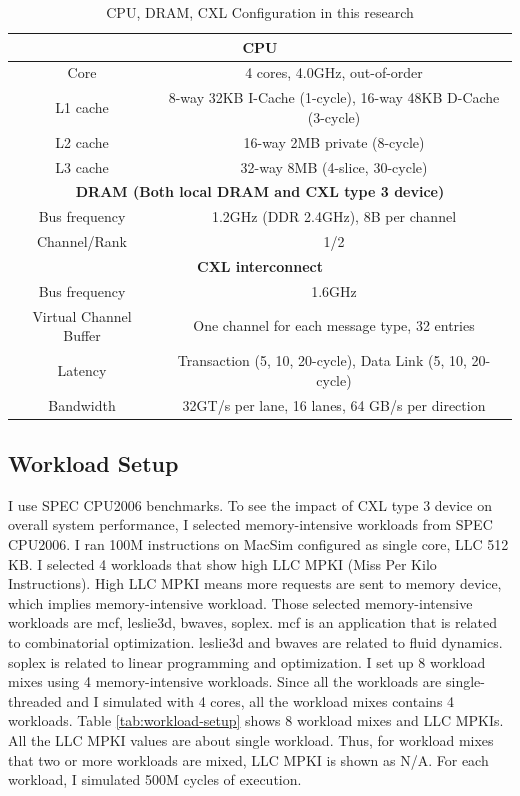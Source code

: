 \begin{table}[t]
  \centering
  \caption{CPU, DRAM, CXL Configuration in this research}
  \label{tab:configuration}
 \begin{tabular}{|c || c|} 
 \hline
 \multicolumn{2}{|c|}{\textbf{CPU}} \\
 \hline
 Core & 4 cores, 4.0GHz, out-of-order \\ 
 L1 cache & 8-way 32KB I-Cache (1-cycle), 16-way 48KB D-Cache (3-cycle) \\
 L2 cache & 16-way 2MB private (8-cycle) \\
 L3 cache & 32-way 8MB (4-slice, 30-cycle) \\
 \hline \hline
 \multicolumn{2}{|c|}{\textbf{DRAM (Both local DRAM and CXL type 3 device)}} \\
 \hline
 Bus frequency & 1.2GHz (DDR 2.4GHz), 8B per channel \\
 Channel/Rank & 1/2 \\
 \hline \hline
 \multicolumn{2}{|c|}{\textbf{CXL interconnect}} \\
 \hline
 Bus frequency & 1.6GHz \\
 Virtual Channel Buffer & One channel for each message type, 32 entries \\
 Latency & Transaction (5, 10, 20-cycle), Data Link (5, 10, 20-cycle) \\
 Bandwidth & 32GT/s per lane, 16 lanes, 64 GB/s per direction \\
 \hline
 \end{tabular}
\end{table}



\subsection{Workload Setup}
\label{sec:workload-setup}
I use SPEC CPU2006 benchmarks. To see the impact of CXL type 3 device on overall system performance, I selected memory-intensive workloads from SPEC CPU2006. I ran 100M instructions on MacSim configured as single core, LLC 512 KB. I selected 4 workloads that show high LLC MPKI (Miss Per Kilo Instructions). High LLC MPKI means more requests are sent to memory device, which implies memory-intensive workload. Those selected memory-intensive workloads are mcf, leslie3d, bwaves, soplex. mcf is an application that is related to combinatorial optimization. leslie3d and bwaves are related to fluid dynamics. soplex is related to linear programming and optimization. I set up 8 workload mixes using 4 memory-intensive workloads. Since all the workloads are single-threaded and I simulated with 4 cores, all the workload mixes contains 4 workloads. Table \ref{tab:workload-setup} shows 8 workload mixes and LLC MPKIs. All the LLC MPKI values are about single workload. Thus, for workload mixes that two or more workloads are mixed, LLC MPKI is shown as N/A.
For each workload, I simulated 500M cycles of execution.

